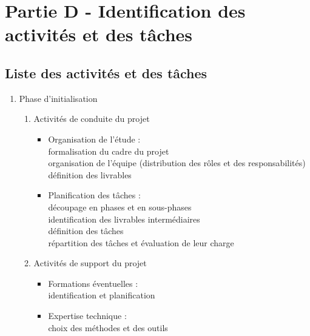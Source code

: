 \chapter*{Partie D - Identification des activités et des tâches}

\section*{Liste des activités et des tâches}


\begin{enumerate}
  \item Phase d'initialisation
    \begin{enumerate}

      \item Activités de conduite du projet
          \begin{itemize}
            \item Organisation de l'étude :\hfill \\
                  formalisation du cadre du projet \hfill \\
                  organisation de l'équipe (distribution des rôles et des responsabilités) \hfill \\
                  définition des livrables \hfill \\
            \item Planification des tâches : \hfill \\
                  découpage en phases et en sous-phases \hfill \\
                  identification des livrables intermédiaires \hfill \\
                  définition des tâches \hfill \\
                  répartition des tâches et évaluation de leur charge \hfill \\
          \end{itemize}

      \item Activités de support du projet
          \begin{itemize}
            \item Formations éventuelles :\hfill \\
                  identification et planification \hfill \\
            \item Expertise technique : \hfill \\
                  choix des méthodes et des outils \hfill \\
          \end{itemize}


\end{enumerate}
\end{enumerate}
